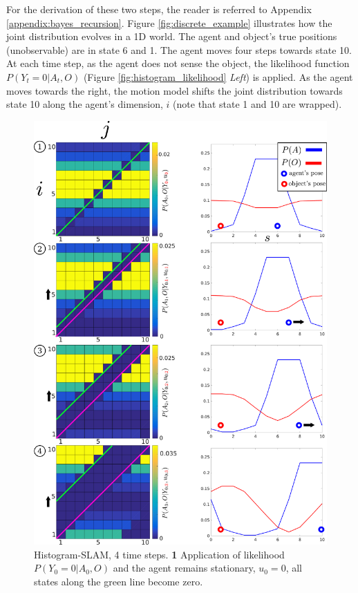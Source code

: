 For the derivation of these  two steps, the reader is referred to Appendix \ref{appendix:bayes_recursion}.
Figure \ref{fig:discrete_example} illustrates how the joint distribution evolves in a 1D world. 
The agent and object's true positions (unobservable) are in state 6 and 1. The agent moves four steps towards state 10. At each time 
step, as the agent does not sense the object, the likelihood function  $P(Y_t=0|A_t,O)$ (Figure \ref{fig:histogram_likelihood} \textit{Left})
is applied. As the agent moves towards the right, the motion model shifts the joint distribution towards state 10 along the agent's 
dimension, $i$ (note that state 1 and 10 are wrapped).

\begin{figure}
 \centering
  \includegraphics[width=\textwidth]{./ch5-MLMF/Figures/explenation/hist_motion.pdf}
  \caption{Histogram-SLAM, 4 time steps. \textbf{1} Application of likelihood $P(Y_0=0|A_0,O)$ and the agent remains stationary, $u_0=0$, all states along the green line become zero.
}
\end{figure}
